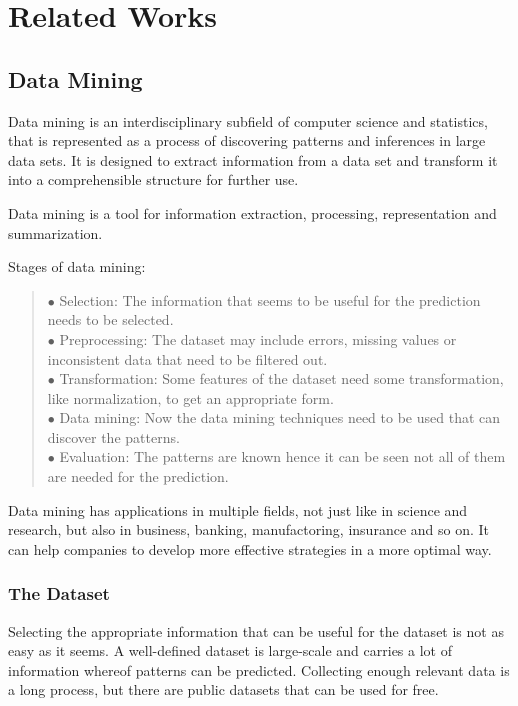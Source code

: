 \chapter{Related Works}

\section{Data Mining}

Data mining \cite{zaki2010advances}\cite{han2011data} is an interdisciplinary subfield of computer science and statistics, that is represented as a process of discovering patterns and inferences in large data sets. It is designed to extract information from a data set and transform it into a comprehensible structure for further use. \medskip

Data mining is a tool for information extraction, processing, representation and summarization. 

\medskip \noindent Stages of data mining:
\begin{verse}
	$\bullet$ Selection: The information that seems to be useful for the prediction needs to be selected.\\
	$\bullet$ Preprocessing: The dataset may include errors, missing values or inconsistent data that need to be filtered out.\\
	$\bullet$ Transformation: Some features of the dataset need some transformation, like normalization, to get an appropriate form.\\
	$\bullet$ Data mining: Now the data mining techniques need to be used that can discover the patterns.\\
	$\bullet$ Evaluation: The patterns are known hence it can be seen not all of them are needed for the prediction.
\end{verse}

Data mining has applications in multiple fields, not just like in science and research, but also in business, banking, manufactoring, insurance and so on. It can help companies to develop more effective strategies in a more optimal way.



\subsection{The Dataset}

Selecting the appropriate information that can be useful for the dataset is not as easy as it seems. A well-defined dataset is large-scale and carries a lot of information whereof patterns can be predicted. Collecting enough relevant data is a long process, but there are public datasets that can be used for free. \medskip

